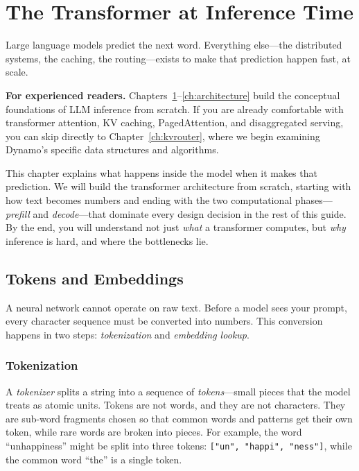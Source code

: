 \chapter{The Transformer at Inference Time}
\label{ch:transformer}

Large language models predict the next word. Everything else---the distributed systems, the caching, the routing---exists to make that prediction happen fast, at scale.

\begin{notebox}
\textbf{For experienced readers.} Chapters~\ref{ch:transformer}--\ref{ch:architecture} build the conceptual foundations of LLM inference from scratch. If you are already comfortable with transformer attention, KV caching, PagedAttention, and disaggregated serving, you can skip directly to Chapter~\ref{ch:kvrouter}, where we begin examining Dynamo's specific data structures and algorithms.
\end{notebox}

This chapter explains what happens inside the model when it makes that prediction. We will build the transformer architecture from scratch, starting with how text becomes numbers and ending with the two computational phases---\emph{prefill} and \emph{decode}---that dominate every design decision in the rest of this guide. By the end, you will understand not just \emph{what} a transformer computes, but \emph{why} inference is hard, and where the bottlenecks lie.

\section{Tokens and Embeddings}

A neural network cannot operate on raw text. Before a model sees your prompt, every character sequence must be converted into numbers. This conversion happens in two steps: \emph{tokenization} and \emph{embedding lookup}.

\subsection{Tokenization}

%
A \emph{tokenizer} splits a string into a sequence of \emph{tokens}---small pieces that the model treats as atomic units. Tokens are not words, and they are not characters. They are sub-word fragments chosen so that common words and patterns get their own token, while rare words are broken into pieces. For example, the word ``unhappiness'' might be split into three tokens: \texttt{["un", "happi", "ness"]}, while the common word ``the'' is a single token.


